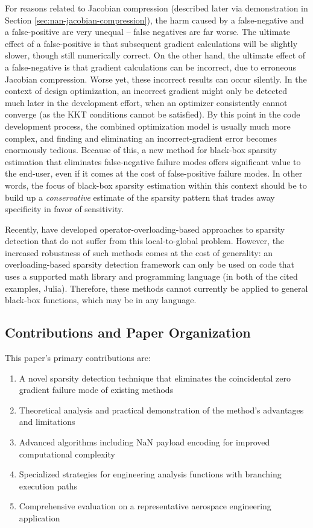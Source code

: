 \documentclass{article}
\begin{document}
For reasons related to Jacobian compression (described later via demonstration in Section \ref{sec:nan-jacobian-compression}), the harm caused by a false-negative and a false-positive are very unequal -- false negatives are far worse. The ultimate effect of a false-positive is that subsequent gradient calculations will be slightly slower, though still numerically correct. On the other hand, the ultimate effect of a false-negative is that gradient calculations can be incorrect, due to erroneous Jacobian compression. Worse yet, these incorrect results can occur silently. In the context of design optimization, an incorrect gradient might only be detected much later in the development effort, when an optimizer consistently cannot converge (as the KKT conditions cannot be satisfied). By this point in the code development process, the combined optimization model is usually much more complex, and finding and eliminating an incorrect-gradient error becomes enormously tedious. Because of this, a new method for black-box sparsity estimation that eliminates false-negative failure modes offers significant value to the end-user, even if it comes at the cost of false-positive failure modes. In other words, the focus of black-box sparsity estimation within this context should be to build up a \emph{conservative} estimate of the sparsity pattern that trades away specificity in favor of sensitivity.

Recently, \cite{hillSparserBetterFaster2025,rackauckasGeneralizingAutomaticDifferentiation2021} have developed operator-overloading-based approaches to sparsity detection that do not suffer from this local-to-global problem. However, the increased robustness of such methods comes at the cost of generality: an overloading-based sparsity detection framework can only be used on code that uses a supported math library and programming language (in both of the cited examples, Julia). Therefore, these methods cannot currently be applied to general black-box functions, which may be in any language.

\subsection{Contributions and Paper Organization}

This paper's primary contributions are:

\begin{enumerate}[noitemsep]
    \item A novel sparsity detection technique that eliminates the coincidental zero gradient failure mode of existing methods
    \item Theoretical analysis and practical demonstration of the method's advantages and limitations
    \item Advanced algorithms including NaN payload encoding for improved computational complexity
    \item Specialized strategies for engineering analysis functions with branching execution paths
    \item Comprehensive evaluation on a representative aerospace engineering application
\end{enumerate}
\end{document}
